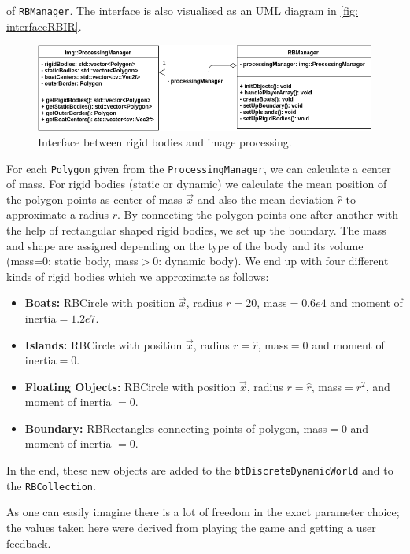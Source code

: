 of \texttt{RBManager}. The interface is also visualised as an UML diagram in \autoref{fig: interfaceRBIR}.
\begin{figure}[ht]
\centering
\includegraphics[scale=0.5]{img/RigidBodies/InterfaceRBImageRecogniton.png}
\caption{Interface between rigid bodies and image processing.}
\label{fig: interfaceRBIR}
\end{figure}


For each \texttt{Polygon} given from the \texttt{ProcessingManager}, we can calculate a center of mass. For rigid bodies (static or dynamic) we calculate the mean position of the polygon points as center of mass $\vec{x}$ and also the mean deviation $\hat{r}$ to approximate a radius $r$. By connecting the polygon points one after another with the help of rectangular shaped rigid bodies, we set up the boundary. The mass and shape are assigned depending on the type of the body and its volume (mass=0: static body, mass$>$0: dynamic body). We end up with four different kinds of rigid bodies which we approximate as follows:
\begin{itemize}
\item \textbf{Boats:} RBCircle with position $\vec{x}$, radius $r=20$, mass$=0.6e4$ and moment of inertia$=1.2e7$.
\item \textbf{Islands:} RBCircle with position $\vec{x}$, radius $r=\hat{r}$, mass$=0$ and moment of inertia$=0$.
\item \textbf{Floating Objects:} RBCircle with position $\vec{x}$, radius $r=\hat{r}$, mass$=r^2$, and moment of inertia $=0$.
\item \textbf{Boundary:} RBRectangles connecting points of polygon, mass$=0$ and moment of inertia $=0$.
\end{itemize}
In the end, these new objects are added to the \texttt{btDiscreteDynamicWorld} and to the \texttt{RBCollection}.


As one can easily imagine there is a lot of freedom in the exact parameter choice; the values taken here were derived from playing the game and getting a user feedback.

